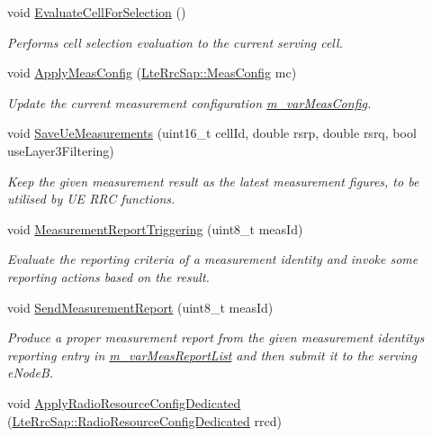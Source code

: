 \begin{DoxyCompactItemize}
void \hyperlink{classns3_1_1LteUeRrc_abe803f32f16828473681933470a76022}{Evaluate\+Cell\+For\+Selection} ()
\begin{DoxyCompactList}\small\item\em Performs cell selection evaluation to the current serving cell. \end{DoxyCompactList}\item 
void \hyperlink{classns3_1_1LteUeRrc_a2cd87b415e4e40dfbaa9d08c406bd9bd}{Apply\+Meas\+Config} (\hyperlink{structns3_1_1LteRrcSap_1_1MeasConfig}{Lte\+Rrc\+Sap\+::\+Meas\+Config} mc)
\begin{DoxyCompactList}\small\item\em Update the current measurement configuration \hyperlink{classns3_1_1LteUeRrc_a27a7773eedfdab964d2514d9eeb1c562}{m\+\_\+var\+Meas\+Config}. \end{DoxyCompactList}\item 
void \hyperlink{classns3_1_1LteUeRrc_a8c90e4b14939e7bd7abfe09c715cf1ef}{Save\+Ue\+Measurements} (uint16\+\_\+t cell\+Id, double rsrp, double rsrq, bool use\+Layer3\+Filtering)
\begin{DoxyCompactList}\small\item\em Keep the given measurement result as the latest measurement figures, to be utilised by UE R\+RC functions. \end{DoxyCompactList}\item 
void \hyperlink{classns3_1_1LteUeRrc_a992083d5b0928a7a88882bede99afd2b}{Measurement\+Report\+Triggering} (uint8\+\_\+t meas\+Id)
\begin{DoxyCompactList}\small\item\em Evaluate the reporting criteria of a measurement identity and invoke some reporting actions based on the result. \end{DoxyCompactList}\item 
void \hyperlink{classns3_1_1LteUeRrc_a053ea56e705de39c3531ec0a393c084d}{Send\+Measurement\+Report} (uint8\+\_\+t meas\+Id)
\begin{DoxyCompactList}\small\item\em Produce a proper measurement report from the given measurement identity\textquotesingle{}s reporting entry in \hyperlink{classns3_1_1LteUeRrc_a82da3c138c967761910c02b83724a0e4}{m\+\_\+var\+Meas\+Report\+List} and then submit it to the serving e\+NodeB. \end{DoxyCompactList}\item 
void \hyperlink{classns3_1_1LteUeRrc_af7c2bc93366a56a35793c3ef6bce5ce3}{Apply\+Radio\+Resource\+Config\+Dedicated} (\hyperlink{structns3_1_1LteRrcSap_1_1RadioResourceConfigDedicated}{Lte\+Rrc\+Sap\+::\+Radio\+Resource\+Config\+Dedicated} rrcd)

\end{DoxyCompactItemize}
